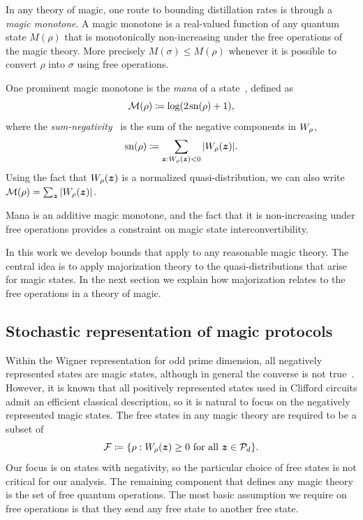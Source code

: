 \documentclass[pra,
aps,
twocolumn,
superscriptaddress,
groupedaddress,
nofootinbib,
reprint
]{revtex4-1}
\begin{document}
In any theory of magic, one route to bounding distillation rates is through a \emph{magic monotone}. A magic monotone is a real-valued function of any quantum state $M(\rho)$ that is monotonically non-increasing under the free operations of the magic theory. More precisely $M(\sigma) \le M(\rho)$ whenever it is possible to convert $\rho$ into $\sigma$ using free operations.

One prominent magic monotone is the \emph{mana} of a state~\cite{cit:veitch2}, defined as
\begin{equation}
    {\mathcal M}(\rho) \coloneqq \log (2\hspace{1pt}{{\rm{sn}}(\rho)}+1),
\end{equation}
where the \emph{sum-negativity}~\cite{cit:veitch2} is the sum of the negative components in $\W{\rho}$,
\begin{equation}
    \sn{\rho} \coloneqq \sum\limits_{\bmz: \W[\bmz]{\rho} < 0} \abs{\W[\bmz]{\rho}}.
\end{equation}
Using the fact that $W_\rho(\boldsymbol{z})$ is a normalized quasi-distribution, we can also write ${\mathcal M}(\rho) = \sum_{\boldsymbol{z}} |W_\rho(\boldsymbol{z})|$.

Mana is an additive magic monotone, and the fact that it is non-increasing under free operations provides a constraint on magic state interconvertibility.

In this work we develop bounds that apply to any reasonable magic theory. The central idea is to apply majorization theory to the quasi-distributions that arise for magic states. In the next section we explain how majorization relates to the free operations in a theory of magic.


\subsection{Stochastic representation of magic protocols}
\label{sec:struc}

Within the Wigner representation for odd prime dimension, all negatively represented states are magic states, although in general the converse is not true~\cite{cit:veitch}. However, it is known that all positively represented states used in Clifford circuits admit an efficient classical description, so it is natural to focus on the negatively represented magic states. The free states in any magic theory are required to be a subset of
\begin{equation}
    \F \coloneqq \{ \rho: \W[\bmz]{\rho} \geq 0 \text{ for all } \bmz \in \cal{P}_d\}.
\end{equation}
Our focus is on states with negativity, so the particular choice of free states is not critical for our analysis. The remaining component that defines any magic theory is the set of free quantum operations. The most basic assumption we require on free operations is that they send any free state to another free state.
\end{document}
